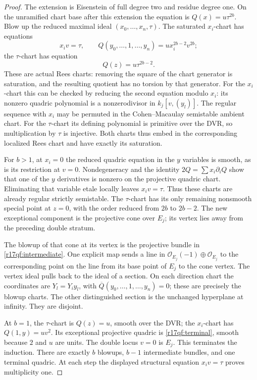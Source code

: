 \begin{proof}
The extension is Eisenstein of full degree two and residue
degree one.  On the unramified chart base after this extension
the equation is
$Q(x)=u\tau^{2b}$.  Blow up the reduced maximal ideal
$(x_0,\ldots,x_n,\tau)$.  The saturated $x_i$-chart has
equations
\[
 x_i v=\tau,\qquad
 Q(y_0,\ldots,1,\ldots,y_n)
                          =u x_i^{2b-2}v^{2b};
 \tag{QF17.8}\label{r17qf:x-chart}
\]
the $\tau$-chart has equation
\[
                         Q(z)=u\tau^{2b-2}.
 \tag{QF17.9}\label{r17qf:tau-chart}
\]
These are actual Rees charts: removing the square of the
chart generator is saturation, and the resulting quotient
has no torsion by that generator.  For the $x_i$-chart this
can be checked by reducing the second equation modulo $x_i$:
its nonzero quadric polynomial is a nonzerodivisor in
$k_j[v,(y_l)]$.  The regular sequence with $x_i$ may be
permuted in the Cohen--Macaulay semistable ambient chart.
For the $\tau$-chart its defining polynomial is primitive
over the DVR, so multiplication by $\tau$ is injective.
Both charts thus embed in the corresponding localized Rees
chart and have exactly its saturation.

For $b>1$, at $x_i=0$ the reduced quadric equation in the
$y$ variables is smooth, as is its restriction at $v=0$.
Nondegeneracy and the identity $2Q=\sum x_i\partial_iQ$
show that one of the $y$ derivatives is nonzero on the
projective quadric chart.  Eliminating that variable etale
locally leaves $x_iv=\tau$.  Thus these charts are already
regular strictly semistable.
The $\tau$-chart has its only remaining nonsmooth special
point at $z=0$, with the order reduced from $2b$ to
$2b-2$.  The new exceptional component is the projective
cone over $E_j$; its vertex lies away from the preceding
double stratum.

The blowup of that cone at its vertex is the projective
bundle in \eqref{r17qf:intermediate}.  One explicit map sends
a line in $\mathcal O_{E_j}(-1)\oplus\mathcal O_{E_j}$ to
the corresponding point on the line from its base point
of $E_j$ to the cone vertex.  The vertex ideal pulls back
to the ideal of a section.  On each direction chart the
coordinates are $Y_l=Y_i y_l$, with
$\overline Q(y_0,\ldots,1,\ldots,y_n)=0$; these are precisely
the blowup charts.  The other distinguished section is the
unchanged hyperplane at infinity.  They are disjoint.

At $b=1$, the $\tau$-chart is $Q(z)=u$, smooth over the
DVR; the $x_i$-chart has $Q(1,y)=uv^2$.  Its exceptional
projective quadric is \eqref{r17qf:terminal}, smooth because
$2$ and $u$ are units.  The double locus $v=0$ is $E_j$.
This terminates the induction.  There are exactly $b$
blowups, $b-1$ intermediate bundles, and one terminal
quadric.  At each step the displayed structural equation
$x_iv=\tau$ proves multiplicity one.


\end{proof}

